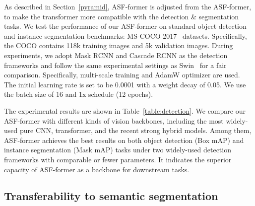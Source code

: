 \documentclass[lettersize,journal]{IEEEtran}
\begin{document}
As described in Section~\ref{pyramid}, ASF-former is adjusted from the ASF-former, to make the transformer more compatible with the detection \& segmentation tasks. We test the performance of our ASF-former on standard object detection and instance segmentation benchmarks: MS-COCO 2017~\cite{Lin2014Mscoco} datasets. Specifically, the COCO contains 118k training images and 5k validation images. During experiments, we adopt Mask RCNN and Cascade RCNN as the detection frameworks and follow the same experimental settings as Swin~\cite{liu2021Swin} for a fair comparison. Specifically, multi-scale training and AdamW optimizer are used. The initial learning rate is set to be 0.0001 with a weight decay of 0.05. We use the batch size of 16 and 1x schedule (12 epochs).

The experimental results are shown in Table~\ref{table:detection}. We compare our ASF-former with different kinds of vision backbones, including the most widely-used pure CNN, transformer, and the recent strong hybrid models. Among them, ASF-former achieves the best results on both object detection (Box mAP) and instance segmentation (Mask mAP) tasks under two widely-used detection frameworks with comparable or fewer parameters. It indicates the superior capacity of ASF-former as a backbone for downstream tasks.

\subsection{Transferability to semantic segmentation}
\label{segmentation}
\end{document}
